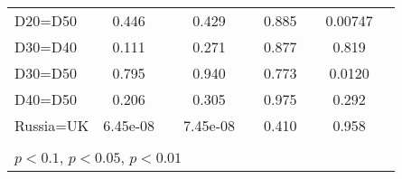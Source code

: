 \begin{tabular}{l|cccccc|cc}
D20=D50         &    0.446         &         &    0.429         &         &    0.885         &         &  0.00747         &         \\
D30=D40         &    0.111         &         &    0.271         &         &    0.877         &         &    0.819         &         \\
D30=D50         &    0.795         &         &    0.940         &         &    0.773         &         &   0.0120         &         \\
D40=D50         &    0.206         &         &    0.305         &         &    0.975         &         &    0.292         &         \\
Russia=UK       & 6.45e-08         &         & 7.45e-08         &         &    0.410         &         &    0.958         &         \\
\hline\hline
\multicolumn{9}{p{16cm}}{\tiny }\\
\multicolumn{9}{l}{\tiny \sym{*} \(p<0.1\), \sym{**} \(p<0.05\), \sym{***} \(p<0.01\)}\\
\end{tabular}